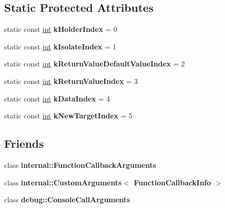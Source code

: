 \subsection*{Static Protected Attributes}
\begin{DoxyCompactItemize}
\item 
\mbox{\label{classv8_1_1FunctionCallbackInfo_a073824921daf8600fb9c00c50ee8ef0c}} 
static const \mbox{\hyperlink{classint}{int}} {\bfseries k\+Holder\+Index} = 0
\item 
\mbox{\label{classv8_1_1FunctionCallbackInfo_a0e2fbe5a323276263c848ea8050a34eb}} 
static const \mbox{\hyperlink{classint}{int}} {\bfseries k\+Isolate\+Index} = 1
\item 
\mbox{\label{classv8_1_1FunctionCallbackInfo_a0b32b5613fe2f0cd139d9dffc0916d09}} 
static const \mbox{\hyperlink{classint}{int}} {\bfseries k\+Return\+Value\+Default\+Value\+Index} = 2
\item 
\mbox{\label{classv8_1_1FunctionCallbackInfo_abb339e201184ebe2502a1202d54201ca}} 
static const \mbox{\hyperlink{classint}{int}} {\bfseries k\+Return\+Value\+Index} = 3
\item 
\mbox{\label{classv8_1_1FunctionCallbackInfo_a152c34c5b2f8c55d04d6d541bf8a4544}} 
static const \mbox{\hyperlink{classint}{int}} {\bfseries k\+Data\+Index} = 4
\item 
\mbox{\label{classv8_1_1FunctionCallbackInfo_a23e70f4737b7e205dc91b972d75fbd9c}} 
static const \mbox{\hyperlink{classint}{int}} {\bfseries k\+New\+Target\+Index} = 5
\end{DoxyCompactItemize}
\subsection*{Friends}
\begin{DoxyCompactItemize}
\item 
\mbox{\label{classv8_1_1FunctionCallbackInfo_aac7268b20857fd75b69b86ded46d0f34}} 
class {\bfseries internal\+::\+Function\+Callback\+Arguments}
\item 
\mbox{\label{classv8_1_1FunctionCallbackInfo_a02d869d89b14ddd1717429c2106f955a}} 
class {\bfseries internal\+::\+Custom\+Arguments$<$ Function\+Callback\+Info $>$}
\item 
\mbox{\label{classv8_1_1FunctionCallbackInfo_aa7dc5c9ac169be8c0feb25eae56c35fe}} 
class {\bfseries debug\+::\+Console\+Call\+Arguments}
\end{DoxyCompactItemize}


